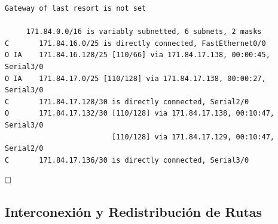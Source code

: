 \documentclass[11pt]{article}
\begin{document}
\begin{enumerate}
\begin{mdframed}
\begin{verbatim}
Gateway of last resort is not set

     171.84.0.0/16 is variably subnetted, 6 subnets, 2 masks
C       171.84.16.0/25 is directly connected, FastEthernet0/0
O IA    171.84.16.128/25 [110/66] via 171.84.17.138, 00:00:45, Serial3/0
O IA    171.84.17.0/25 [110/128] via 171.84.17.138, 00:00:27, Serial3/0
C       171.84.17.128/30 is directly connected, Serial2/0
O       171.84.17.132/30 [110/128] via 171.84.17.138, 00:10:47, Serial3/0
                         [110/128] via 171.84.17.129, 00:10:47, Serial2/0
C       171.84.17.136/30 is directly connected, Serial3/0
\end{verbatim}
\end{mdframed}


$\hfill\square$

\end{enumerate}

\subsection{Interconexión y Redistribución de Rutas}
\end{document}
